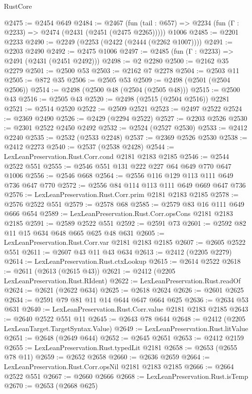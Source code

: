 \begin{lexlean}{RustCore}
\begin{coremodule}
@2475 := @2454 @649
@2484 := @2467
    (fun (tail : @657) => @2234 (fun (Γ : @2233) => @2474 (@2431 (@2451 (@2475 @2265)))))
    @1006
@2485 := @2201 @2233
@2490 := @2249 (@2253 (@2422 (@2444 (@2262 @1007))))
@2491 := @2203 @2490
@2492 := @2475 @1006
@2497 := @2485 (fun (Γ : @2233) => @2491 (@2431 (@2451 @2492)))
@2498 := @2 @2280
@2500 := @2162 @35 @2279
@2501 := @2500 @53
@2503 := @2162 @7 @2278
@2504 := @2503 @11
@2505 := @872 @35
@2506 := @2505 @53
@2509 := @2498 (@2501 (@2504 @2506))
@2514 := @2498 (@2500 @48 (@2504 (@2505 @48)))
@2515 := @2500 @43
@2516 := @2505 @43
@2520 := @2498 (@2515 (@2504 @2516)) @2281
@2521 := @2514 @2520
@2522 := @2509 @2521
@2523 := @2497 @2522
@2524 := @2369 @2490
@2526 := @2429 (@2294 @2522)
@2527 := @2203 @2526
@2530 := @2301 @2522 @2450 @2492
@2532 := @2524 (@2527 @2530)
@2533 := @2412 @2240
@2535 := @2532 (@2533 @2248)
@2537 := @2369 @2526 @2530
@2538 := @2412 @2273
@2540 := @2537 (@2538 @2428)
@2544 := LexLeanPreservation.Rust.Corr.cond @2181 @2183 @2185
@2546 := @2544 @2522 @551
@2555 := @2546 @551 @131 @222 @227 @64 @649 @770 @647 @1006
@2556 := @2546 @668
@2564 := @2556 @116 @129 @113 @111 @649 @736 @647 @770
@2572 := @2556 @84 @114 @113 @111 @649 @669 @647 @736
@2576 := LexLeanPreservation.Rust.Corr.prim @2181 @2183 @2185
@2578 := @2576 @2522 @551
@2579 := @2578 @68
@2585 := @2579 @83 @16 @111 @649 @666 @654
@2589 := LexLeanPreservation.Rust.Corr.opsCons @2181 @2183 @2185
@2591 := @2589 @2522 @551
@2592 := @2591 @73
@2601 := @2592 @82 @11 @15 @634 @648 @665 @625 @48 @631
@2605 := LexLeanPreservation.Rust.Corr.var @2181 @2183 @2185
@2607 := @2605 @2522 @551
@2611 := @2607 @43 @11 @43 @634
@2613 := @2412 (@2205 @2279)
@2614 := LexLeanPreservation.Rust.ctxLookup
@2615 := @2614 @2522
@2618 := @2611 (@2613 (@2615 @43))
@2621 := @2412 (@2205 LexLeanPreservation.Rust.RIdent)
@2622 := LexLeanPreservation.Rust.readOf
@2624 := @2621 (@2622 @634)
@2625 := @2618 @2624
@2626 := @2601 @2625
@2634 := @2591 @79 @81 @11 @14 @644 @647 @664 @625
@2636 := @2634 @53 @631
@2640 := LexLeanPreservation.Rust.Corr.value @2181 @2183 @2185
@2643 := @2640 @2522 @551 @11
@2645 := @2643 @78 @644
@2648 := @2412 (@2205 LexLeanTarget.TargetSyntax.Value)
@2649 := LexLeanPreservation.Rust.litValue
@2651 := @2648 (@2649 @644)
@2652 := @2645 @2651
@2653 := @2412 @2159
@2655 := LexLeanPreservation.Rust.typedLit @2181
@2658 := @2653 (@2655 @78 @11)
@2659 := @2652 @2658
@2660 := @2636 @2659
@2664 := LexLeanPreservation.Rust.Corr.opsNil @2181 @2183 @2185
@2666 := @2664 @2522 @551
@2667 := @2660 @2666
@2668 := LexLeanPreservation.Rust.isTemp
@2670 := @2653 (@2668 @625)

\end{coremodule}
\end{lexlean}
